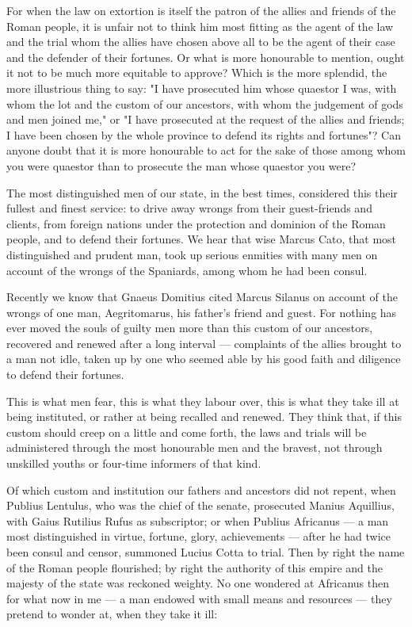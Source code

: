  For when the law on extortion is itself the patron of the allies and friends of the Roman people, it is unfair not to think him most fitting as the agent of the law and the trial whom the allies have chosen above all to be the agent of their case and the defender of their fortunes. Or what is more honourable to mention, ought it not to be much more equitable to approve? Which is the more splendid, the more illustrious thing to say: "I have prosecuted him whose quaestor I was, with whom the lot and the custom of our ancestors, with whom the judgement of gods and men joined me," or "I have prosecuted at the request of the allies and friends; I have been chosen by the whole province to defend its rights and fortunes"? Can anyone doubt that it is more honourable to act for the sake of those among whom you were quaestor than to prosecute the man whose quaestor you were?

 The most distinguished men of our state, in the best times, considered this their fullest and finest service: to drive away wrongs from their guest-friends and clients, from foreign nations under the protection and dominion of the Roman people, and to defend their fortunes. We hear that wise Marcus Cato, that most distinguished and prudent man, took up serious enmities with many men on account of the wrongs of the Spaniards, among whom he had been consul.

 Recently we know that Gnaeus Domitius cited Marcus Silanus on account of the wrongs of one man, Aegritomarus, his father's friend and guest. For nothing has ever moved the souls of guilty men more than this custom of our ancestors, recovered and renewed after a long interval --- complaints of the allies brought to a man not idle, taken up by one who seemed able by his good faith and diligence to defend their fortunes.

 This is what men fear, this is what they labour over, this is what they take ill at being instituted, or rather at being recalled and renewed. They think that, if this custom should creep on a little and come forth, the laws and trials will be administered through the most honourable men and the bravest, not through unskilled youths or four-time informers of that kind.

 Of which custom and institution our fathers and ancestors did not repent, when Publius Lentulus, who was the chief of the senate, prosecuted Manius Aquillius, with Gaius Rutilius Rufus as subscriptor; or when Publius Africanus --- a man most distinguished in virtue, fortune, glory, achievements --- after he had twice been consul and censor, summoned Lucius Cotta to trial. Then by right the name of the Roman people flourished; by right the authority of this empire and the majesty of the state was reckoned weighty. No one wondered at Africanus then for what now in me --- a man endowed with small means and resources --- they pretend to wonder at, when they take it ill:

